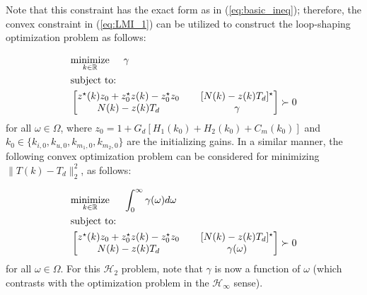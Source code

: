 \documentclass[a4paper, 10pt, conference]{ieeeconf}
\begin{document}
Note that this constraint has the exact form as in (\ref{eq:basic_ineq}); therefore, the convex constraint in (\ref{eq:LMI_1}) can be utilized to construct the loop-shaping optimization problem as follows:

\begin{equation} \label{eq:loop_shape_LMI_inf}
\begin{aligned}
& \underset{ k \in \mathbb{R}}{\text{minimize}} \hspace{0.5cm} \gamma  \\
& \text{subject to:} \\
&
\begin{bmatrix}
z^{\star}(k)z_0 + z_0^{\star}z(k) - z_0^{\star}z_0 & \phantom{xx}[N(k)-z(k)T_d]^{\star} \\ 
N(k)-z(k)T_d & \phantom{xx}\gamma
\end{bmatrix} \succ 0
\end{aligned}
\end{equation}
for all $\omega \in \Omega$, where $z_0 = 1+G_d[H_1(k_0) + H_2(k_0)+C_m(k_0)]$ and $k_0 \in \{k_{i,0},k_{u,0},k_{m_1,0},k_{m_2,0}  \}$ are the initializing gains. In a similar manner, the following convex optimization problem can be considered for minimizing  $ \|T(k)- T_d \|_2^2$, as follows:

\begin{equation} \label{eq:loop_shape_LMI_2}
\begin{aligned}
& \underset{ k \in \mathbb{R}}{\text{minimize}} \hspace{0.5cm} \int_0^\infty \gamma(\omega) d\omega  \\
& \text{subject to:} \\
&
\begin{bmatrix}
z^{\star}(k)z_0 + z_0^{\star}z(k) - z_0^{\star}z_0 & \phantom{xx}[N(k)-z(k)T_d]^{\star} \\ 
N(k)-z(k)T_d & \phantom{xx}\gamma(\omega)
\end{bmatrix} \succ 0
\end{aligned}
\end{equation}
for all $\omega \in \Omega$. For this $\mathcal{H}_2$ problem, note that $\gamma$ is now a function of $\omega$ (which contrasts with the optimization problem in the $\mathcal{H}_\infty$ sense). 
\end{document}
